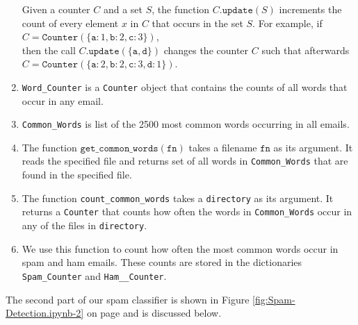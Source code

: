 \begin{enumerate}
      Given a counter $C$ and a set $S$, the function $C.\texttt{update}(S)$ increments the count of every
      element $x$ in $C$ that occurs in the set $S$.  For example, if
      \\[0.2cm]
      \hspace*{1.3cm}
      $C = \mathtt{Counter}(\{\mathtt{a}\colon 1, \mathtt{b}\colon 2, \mathtt{c}\colon 3\})$, 
      \\[0.2cm]
      then the call $C.\mathtt{update}(\{\mathtt{a}, \mathtt{d}\})$ changes the counter $C$ such that afterwards
      \\[0.2cm]
      \hspace*{1.3cm}
      $C = \mathtt{Counter}(\{\mathtt{a}\colon 2, \mathtt{b}\colon 2, \mathtt{c}\colon 3, \mathtt{d}\colon 1\})$.
\item \texttt{Word\_Counter} is a \texttt{Counter} object that contains the counts of all words that occur in
      any email.
\item \texttt{Common\_Words} is list of the 2500 most common words occurring in all emails.
\item The function $\texttt{get\_common\_words}(\texttt{fn})$ takes a filename $\texttt{fn}$ 
      as its argument.  It reads the specified file and returns set of all words in \texttt{Common\_Words} that
      are found in the specified file.  
\item The function \texttt{count\_common\_words} takes a \texttt{directory} as its argument.  It returns a 
      \texttt{Counter} that counts how often the words in \texttt{Common\_Words} occur in any of the files in
      \texttt{directory}.
\item We use this function to count how often the most common words occur in spam and ham emails.
      These counts are stored in the dictionaries \texttt{Spam\_Counter} and \texttt{Ham\_\_Counter}.
\end{enumerate}
The second part of our spam classifier is shown in Figure \ref{fig:Spam-Detection.ipynb-2} on page
\pageref{fig:Spam-Detection.ipynb-2} and is discussed below.


